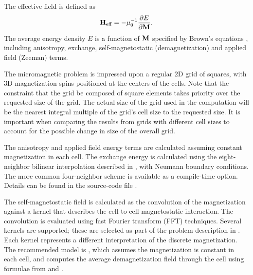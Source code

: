 The effective field is defined as
\html{\begin{center}}
\begin{displaymath}
  \textbf{H}_{\rm eff} = -\mu_0^{-1} \frac{\partial E}{\partial\textbf{M}}.
\end{displaymath}
\html{\end{center}}
The average energy density $E$ is a function of
$\textbf{M}$ specified by Brown's equations \cite{brown1963}, including
anisotropy,
exchange, self-magnetostatic
(demagnetization) and applied
field (Zeeman) terms.

The micromagnetic problem is impressed upon a regular 2D
grid of squares, with 3D magnetization spins positioned at
the centers of the cells.  Note that the constraint that the grid be
composed of square elements takes priority over the requested size of
the grid.  The actual size of the grid used in the computation will be
the nearest integral multiple of the grid's cell size to the requested
size.  It is important when comparing the results from grids with
different cell sizes to account for the possible change in size of the
overall grid.

The anisotropy and applied field energy terms are calculated
assuming constant magnetization in each cell.  The exchange energy is
calculated using the eight-neighbor bilinear interpolation described in
\cite{donahue1997}, with Neumann boundary conditions.  The more common
four-neighbor scheme is available as a compile-time option.  Details can
be found in the source-code file .

The self-magnetostatic field is calculated as the convolution of the
magnetization against a kernel that describes the cell to cell
magnetostatic interaction.  The convolution is evaluated using fast
Fourier transform (FFT) techniques.  Several kernels are
supported; these are selected as part of the problem description in
.  Each kernel represents a different
interpretation of the discrete magnetization.  The recommended model is
, which assumes the magnetization is constant in each cell,
and computes the average demagnetization field through the cell using
formulae from \cite{newell1993} and \cite{aharoni1998}.


